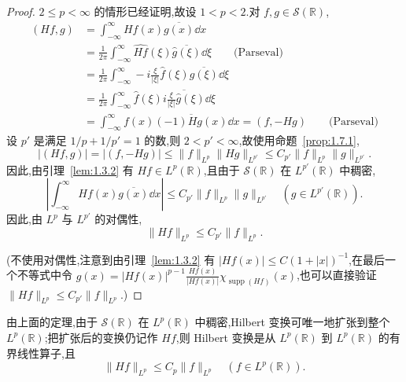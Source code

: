 \begin{proof}
$2 \leq p < \infty$ 的情形已经证明,故设 $1 < p < 2$.对 $f, g \in \mathcal{S}(\mathbb{R})$,
\begin{align*}
(Hf, g) & = \int_{-\infty}^{\infty} Hf(x)\overline{g(x)}\dd x \\
& = \frac{1}{2\pi}\int_{-\infty}^{\infty}\widehat{Hf}(\xi)\overline{\hat{g}(\xi)}\dd \xi \qquad \text{(Parseval)} \\
& = \frac{1}{2\pi}\int_{-\infty}^{\infty} -i\frac{\xi}{|\xi|}\hat{f}(\xi)\overline{\hat{g}(\xi)}\dd \xi \\
& = \frac{1}{2\pi}\int_{-\infty}^{\infty} \hat{f}(\xi)\overline{i\frac{\xi}{|\xi|}\hat{g}(\xi)}\dd \xi \\
& = \int_{-\infty}^{\infty} f(x)\overline{(-1)Hg(x)}\dd x = (f, -Hg) \qquad \text{(Parseval)}
\end{align*}
设 $p'$ 是满足 $1/p + 1/p' = 1$ 的数,则 $2 < p' < \infty$,故使用命题~\ref{prop:1.7.1},
\begin{equation*}
|(Hf, g)| = |(f, -Hg)| \leq \| f \|_{L^{p}}\| Hg \|_{L^{p'}} \leq C_{p'}\| f \|_{L^{p}}\| g \|_{L^{p'}}.
\end{equation*}
因此,由引理~\ref{lem:1.3.2} 有 $Hf \in L^{p}(\mathbb{R})$,且由于 $\mathcal{S}(\mathbb{R})$ 在 $L^{p'}(\mathbb{R})$ 中稠密,
\begin{equation*}
\left|\int_{-\infty}^{\infty} Hf(x)\overline{g(x)}\dd x\right| \leq C_{p'}\| f \|_{L^{p}}\| g \|_{L^{p'}} \quad (g \in L^{p'}(\mathbb{R})).
\end{equation*}
因此,由 $L^{p}$ 与 $L^{p'}$ 的对偶性,
\begin{equation*}
\| Hf \|_{L^{p}} \leq C_{p'}\| f \|_{L^{p}}.
\end{equation*}

(不使用对偶性,注意到由引理~\ref{lem:1.3.2} 有 $|Hf(x)| \leq C(1 + |x|)^{-1}$,在最后一个不等式中令 $g(x) = |Hf(x)|^{p-1}\frac{Hf(x)}{|Hf(x)|}\chi_{\operatorname{supp}(Hf)}(x)$,也可以直接验证 $\| Hf \|_{L^{p}} \leq C_{p'}\| f \|_{L^{p}}$.)
\end{proof}

\begin{note}\label{note:1.7.3}
由上面的定理,由于 $\mathcal{S}(\mathbb{R})$ 在 $L^{p}(\mathbb{R})$ 中稠密,Hilbert 变换可唯一地扩张到整个 $L^{p}(\mathbb{R})$;把扩张后的变换仍记作 $Hf$,则 Hilbert 变换是从 $L^{p}(\mathbb{R})$ 到 $L^{p}(\mathbb{R})$ 的有界线性算子,且
\begin{equation*}
\| Hf \|_{L^{p}} \leq C_{p}\| f \|_{L^{p}} \quad (f \in L^{p}(\mathbb{R})).
\end{equation*}
\end{note}

